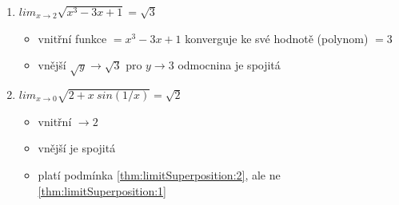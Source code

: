 \begin{example}\noindent
    \begin{enumerate}
        \item $lim_{x\to 2}\sqrt{x^3-3x+1}=\sqrt{3}$
            \begin{itemize}
                \item vnitřní funkce $=x^3-3x+1$ konverguje ke své hodnotě (polynom) $=3$
                \item vnější $\sqrt{y}\rightarrow\sqrt{3}\text{ pro }y\rightarrow 3$ odmocnina je spojitá
            \end{itemize}
        \item $lim_{x\to 0}\sqrt{2+x~sin(1/x)}=\sqrt{2}$
            \begin{itemize}
                \item vnitřní $\rightarrow 2$
                \item vnější je spojitá
                \item platí podmínka \autoref{thm:limitSuperposition:2}, ale ne \autoref{thm:limitSuperposition:1}
            \end{itemize}
    \end{enumerate}
\end{example}

